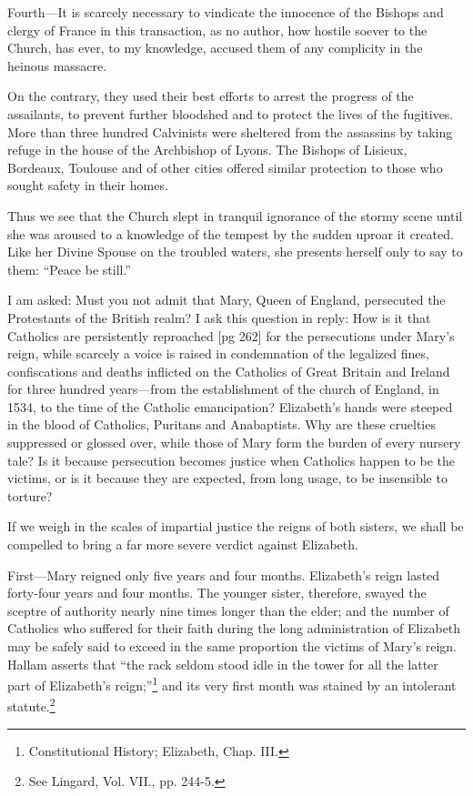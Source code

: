 Fourth—It is scarcely necessary to vindicate
the innocence of the Bishops and clergy of France
in this transaction, as no author, how hostile soever
to the Church, has ever, to my knowledge,
accused them of any complicity in the heinous
massacre.

On the contrary, they used their best efforts
to arrest the progress of the assailants, to prevent
further bloodshed and to protect the lives of
the fugitives. More than three hundred Calvinists
were sheltered from the assassins by taking
refuge in the house of the Archbishop of Lyons.
The Bishops of Lisieux, Bordeaux, Toulouse and
of other cities offered similar protection to those
who sought safety in their homes.

Thus we see that the Church slept in tranquil
ignorance of the stormy scene until she was
aroused to a knowledge of the tempest by the
sudden uproar it created. Like her Divine Spouse
on the troubled waters, she presents herself only
to say to them: “Peace be still.”


I am asked: Must you not admit that Mary,
Queen of England, persecuted the Protestants of
the British realm? I ask this question in reply:
How is it that Catholics are persistently reproached
[pg 262]
for the persecutions under Mary's reign,
while scarcely a voice is raised in condemnation
of the legalized fines, confiscations and deaths inflicted
on the Catholics of Great Britain and Ireland
for three hundred years—from the establishment
of the church of England, in 1534, to the
time of the Catholic emancipation? Elizabeth's
hands were steeped in the blood of Catholics,
Puritans and Anabaptists. Why are these cruelties
suppressed or glossed over, while those of
Mary form the burden of every nursery tale? Is
it because persecution becomes justice when Catholics
happen to be the victims, or is it because they
are expected, from long usage, to be insensible to
torture?

If we weigh in the scales of impartial justice
the reigns of both sisters, we shall be compelled
to bring a far more severe verdict against Elizabeth.

First—Mary reigned only five years and four
months. Elizabeth's reign lasted forty-four years
and four months. The younger sister, therefore,
swayed the sceptre of authority nearly nine times
longer than the elder; and the number of Catholics
who suffered for their faith during the long
administration of Elizabeth may be safely said to
exceed in the same proportion the victims of
Mary's reign. Hallam asserts that “the rack seldom
stood idle in the tower for all the latter part
of Elizabeth's reign;”\footnote{Constitutional
History; Elizabeth, Chap. III.} and its very first month
was stained by an intolerant statute.\footnote{See
Lingard, Vol. VII., pp. 244-5.}

